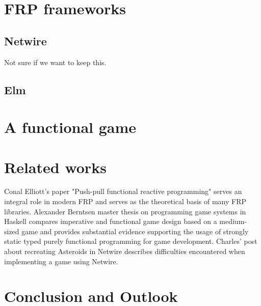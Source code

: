 \documentclass[pdftex,a4paper]{extarticle}
\begin{document}
\section{FRP frameworks}
\label{sec:frameworks}
\subsection{Netwire}
Not sure if we want to keep this.
\subsection{Elm}

\section{A functional game}
\label{sec:game}

\section{Related works}
\label{sec:related}
Conal Elliott's paper "Push-pull functional reactive programming" \cite{Elliott2009-push-pull-frp} serves an integral role in modern FRP
and serves as the theoretical basis of many FRP libraries. Alexander Berntsen master thesis on programming game systems in Haskell \cite{Berntsen2014-game-systems-haskell} compares imperative and functional game design based on a medium-sized game and provides substantial evidence supporting the usage of strongly static typed purely functional programming for game development. Charles' post about recreating Asteroids in Netwire \cite{asteroids} describes difficulties encountered when implementing a game using Netwire.
\section{Conclusion and Outlook}
\label{sec:conclusion}



\end{document}
